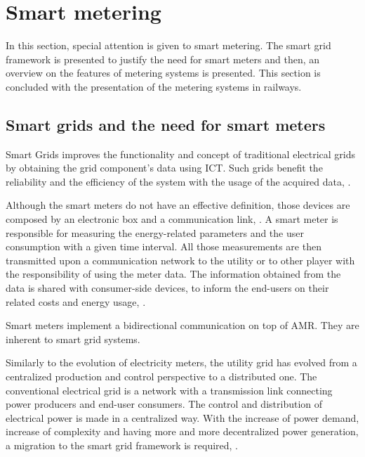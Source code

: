 


\section{Smart metering}

In this section, special attention is given to smart metering. The smart grid framework is presented to justify the need for smart meters and then, an overview on the features of metering systems is presented.
This section is concluded with the presentation of the metering systems in railways.






\subsection{Smart grids and the need for smart meters}

Smart Grids improves the functionality and concept of traditional electrical grids by obtaining the grid component's data using \ac{ICT}. Such grids benefit the reliability and the efficiency of the system with the usage of the acquired data, \cite{Mohassel2014}.

Although the smart meters do not have an effective definition, those devices are composed by an electronic box and a communication link, \cite{Seppo2012}. A smart meter is responsible for measuring the energy-related parameters and the user consumption with a given time interval. All those measurements are then transmitted upon a communication network to the utility or to other player with the responsibility of using the meter data. The information obtained from the data is shared with consumer-side devices, to inform the end-users on their related costs and energy usage, \cite{Siano2014}.

Smart meters implement a bidirectional communication on top of \ac{AMR}. They are inherent to smart grid systems. 

Similarly to the evolution of electricity meters, the utility grid has evolved from a centralized production and control perspective to a distributed one. The conventional electrical grid is a network with a transmission link connecting power producers and end-user consumers. The control and distribution of electrical power is made in a centralized way. With the increase of power demand, increase of complexity and having more and more decentralized power generation, a migration to the smart grid framework is required, \cite{Reddy2014}.

